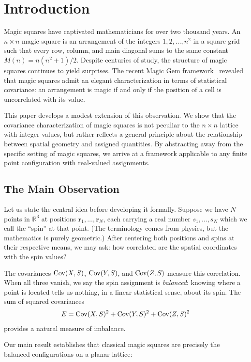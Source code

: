 \section{Introduction}
\label{sec:introduction}

Magic squares have captivated mathematicians for over two thousand years. An $n \times n$ magic square is an arrangement of the integers $1, 2, \ldots, n^2$ in a square grid such that every row, column, and main diagonal sums to the same constant $M(n) = n(n^2+1)/2$. Despite centuries of study, the structure of magic squares continues to yield surprises. The recent Magic Gem framework~\cite{magic_gems_2025} revealed that magic squares admit an elegant characterization in terms of statistical covariance: an arrangement is magic if and only if the position of a cell is uncorrelated with its value.

This paper develops a modest extension of this observation. We show that the covariance characterization of magic squares is not peculiar to the $n \times n$ lattice with integer values, but rather reflects a general principle about the relationship between spatial geometry and assigned quantities. By abstracting away from the specific setting of magic squares, we arrive at a framework applicable to any finite point configuration with real-valued assignments.

\subsection{The Main Observation}

Let us state the central idea before developing it formally. Suppose we have $N$ points in $\mathbb{R}^3$ at positions $\mathbf{r}_1, \ldots, \mathbf{r}_N$, each carrying a real number $s_1, \ldots, s_N$ which we call the ``spin'' at that point. (The terminology comes from physics, but the mathematics is purely geometric.) After centering both positions and spins at their respective means, we may ask: how correlated are the spatial coordinates with the spin values?

The covariances $\operatorname{Cov}(X, S)$, $\operatorname{Cov}(Y, S)$, and $\operatorname{Cov}(Z, S)$ measure this correlation. When all three vanish, we say the spin assignment is \emph{balanced}: knowing where a point is located tells us nothing, in a linear statistical sense, about its spin. The sum of squared covariances
\[
E = \operatorname{Cov}(X,S)^2 + \operatorname{Cov}(Y,S)^2 + \operatorname{Cov}(Z,S)^2
\]
provides a natural measure of imbalance.

Our main result establishes that classical magic squares are precisely the balanced configurations on a planar lattice:


